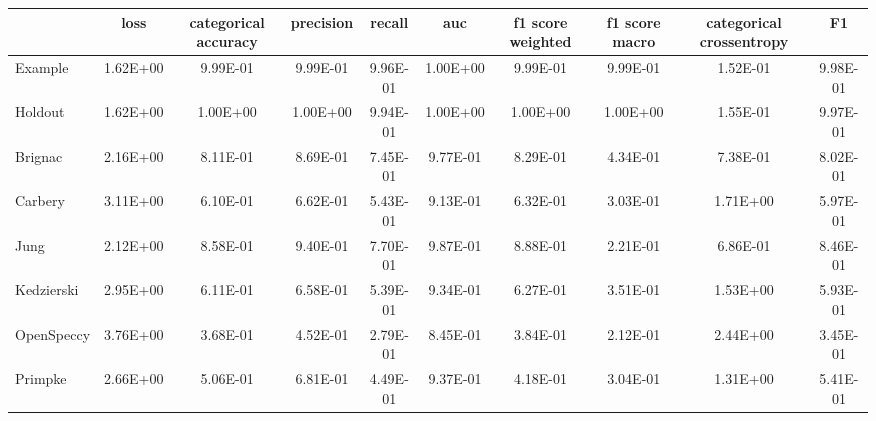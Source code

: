 \begin{tabular}{lccccccccc}
\toprule
 & loss & categorical accuracy & precision & recall & auc & f1 score weighted & f1 score macro & categorical crossentropy & F1 \\
\midrule
Example & 1.62E+00 & 9.99E-01 & 9.99E-01 & 9.96E-01 & 1.00E+00 & 9.99E-01 & 9.99E-01 & 1.52E-01 & 9.98E-01 \\
Holdout & 1.62E+00 & 1.00E+00 & 1.00E+00 & 9.94E-01 & 1.00E+00 & 1.00E+00 & 1.00E+00 & 1.55E-01 & 9.97E-01 \\
Brignac & 2.16E+00 & 8.11E-01 & 8.69E-01 & 7.45E-01 & 9.77E-01 & 8.29E-01 & 4.34E-01 & 7.38E-01 & 8.02E-01 \\
Carbery & 3.11E+00 & 6.10E-01 & 6.62E-01 & 5.43E-01 & 9.13E-01 & 6.32E-01 & 3.03E-01 & 1.71E+00 & 5.97E-01 \\
Jung & 2.12E+00 & 8.58E-01 & 9.40E-01 & 7.70E-01 & 9.87E-01 & 8.88E-01 & 2.21E-01 & 6.86E-01 & 8.46E-01 \\
Kedzierski & 2.95E+00 & 6.11E-01 & 6.58E-01 & 5.39E-01 & 9.34E-01 & 6.27E-01 & 3.51E-01 & 1.53E+00 & 5.93E-01 \\
OpenSpeccy & 3.76E+00 & 3.68E-01 & 4.52E-01 & 2.79E-01 & 8.45E-01 & 3.84E-01 & 2.12E-01 & 2.44E+00 & 3.45E-01 \\
Primpke & 2.66E+00 & 5.06E-01 & 6.81E-01 & 4.49E-01 & 9.37E-01 & 4.18E-01 & 3.04E-01 & 1.31E+00 & 5.41E-01 \\
\bottomrule
\end{tabular}
